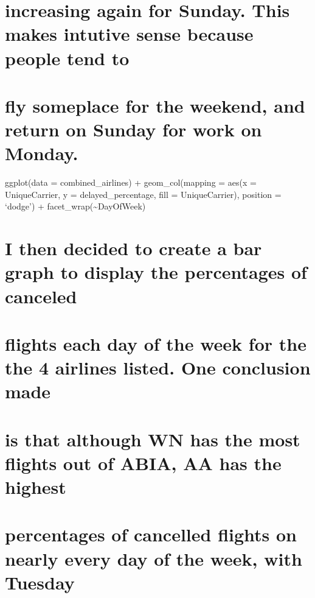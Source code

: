 \documentclass[
]{article}
\begin{document}
\hypertarget{increasing-again-for-sunday.-this-makes-intutive-sense-because-people-tend-to}{%
\section{increasing again for Sunday. This makes intutive sense because
people tend
to}\label{increasing-again-for-sunday.-this-makes-intutive-sense-because-people-tend-to}}

\hypertarget{fly-someplace-for-the-weekend-and-return-on-sunday-for-work-on-monday.}{%
\section{fly someplace for the weekend, and return on Sunday for work on
Monday.}\label{fly-someplace-for-the-weekend-and-return-on-sunday-for-work-on-monday.}}

ggplot(data = combined\_airlines) + geom\_col(mapping = aes(x =
UniqueCarrier, y = delayed\_percentage, fill = UniqueCarrier), position
= `dodge') + facet\_wrap(\textasciitilde DayOfWeek)

\hypertarget{i-then-decided-to-create-a-bar-graph-to-display-the-percentages-of-canceled}{%
\section{I then decided to create a bar graph to display the percentages
of
canceled}\label{i-then-decided-to-create-a-bar-graph-to-display-the-percentages-of-canceled}}

\hypertarget{flights-each-day-of-the-week-for-the-the-4-airlines-listed.-one-conclusion-made}{%
\section{flights each day of the week for the the 4 airlines listed. One
conclusion
made}\label{flights-each-day-of-the-week-for-the-the-4-airlines-listed.-one-conclusion-made}}

\hypertarget{is-that-although-wn-has-the-most-flights-out-of-abia-aa-has-the-highest}{%
\section{is that although WN has the most flights out of ABIA, AA has
the
highest}\label{is-that-although-wn-has-the-most-flights-out-of-abia-aa-has-the-highest}}

\hypertarget{percentages-of-cancelled-flights-on-nearly-every-day-of-the-week-with-tuesday}{%
\section{percentages of cancelled flights on nearly every day of the
week, with
Tuesday}\label{percentages-of-cancelled-flights-on-nearly-every-day-of-the-week-with-tuesday}}
\end{document}
